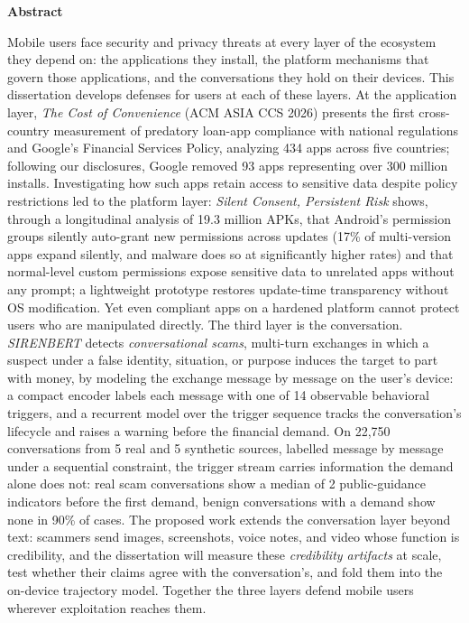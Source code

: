 \documentclass[letterpaper,11pt]{article}
\begin{document}
\begin{titlepage}
\begin{center}\bfseries Abstract\end{center}
\noindent
Mobile users face security and privacy threats at every layer of the
ecosystem they depend on: the applications they install, the platform
mechanisms that govern those applications, and the conversations they
hold on their devices. This dissertation develops defenses for users at
each of these layers. At the application layer, \emph{The Cost of
Convenience} (ACM ASIA CCS 2026) presents the first cross-country
measurement of predatory loan-app compliance with national regulations
and Google's Financial Services Policy, analyzing 434 apps across five
countries; following our disclosures, Google removed 93 apps
representing over 300 million installs. Investigating how such apps
retain access to sensitive data despite policy restrictions led to the
platform layer: \emph{Silent Consent, Persistent Risk} shows, through a
longitudinal analysis of 19.3 million APKs, that Android's permission
groups silently auto-grant new permissions across updates (17\% of
multi-version apps expand silently, and malware does so at
significantly higher rates) and that normal-level custom permissions
expose sensitive data to unrelated apps without any prompt; a
lightweight prototype restores update-time transparency without OS
modification. Yet even compliant apps on a hardened platform cannot
protect users who are manipulated directly. The third layer is the
conversation. \emph{SIRENBERT} detects \emph{conversational scams},
multi-turn exchanges in which a suspect under a false identity,
situation, or purpose induces the target to part with money, by
modeling the exchange message by message on the user's device: a
compact encoder labels each message with one of 14 observable
behavioral triggers, and a recurrent model over the trigger sequence
tracks the conversation's lifecycle and raises a warning before the
financial demand. On 22,750 conversations from 5 real and 5 synthetic
sources, labelled message by message under a sequential constraint,
the trigger stream carries information the demand alone does not:
real scam conversations show a median of 2 public-guidance indicators
before the first demand, benign conversations with a demand show none
in 90\% of cases. The proposed work extends the conversation layer
beyond text: scammers send images, screenshots, voice notes, and video
whose function is credibility, and the dissertation will measure these
\emph{credibility artifacts} at scale, test whether their claims agree
with the conversation's, and fold them into the on-device trajectory
model. Together the three layers defend mobile users wherever
exploitation reaches them.
\end{titlepage}
\end{document}
